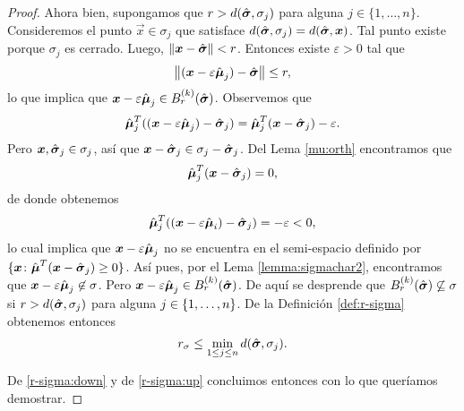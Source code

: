 \begin{proof}
	Ahora bien, supongamos que $r > d(\hat{\boldsymbol{ \sigma }}, \sigma_j)$ para alguna $j \in \lbrace 1, \ldots,
	n \rbrace$. Consideremos el punto $\vec{x} \in \sigma_j$ que satisface $d(\hat{\boldsymbol{ \sigma }}, \sigma_j) =
	d(\hat{\boldsymbol{ \sigma }}, \boldsymbol{x})$. Tal punto existe porque $\sigma_j$ es cerrado. Luego,
	$\left\lVert \boldsymbol{x} - \hat{\boldsymbol{ \sigma }} \right\rVert < r$. Entonces existe $\varepsilon > 0$ tal que
	\begin{equation*}
		\left\lVert (\boldsymbol{x} - \varepsilon\hat{\boldsymbol{ \mu }}_j) - \hat{\boldsymbol{ \sigma }} \right\rVert \leq r,
	\end{equation*}
	lo que implica que $\boldsymbol{x} - \varepsilon\hat{\boldsymbol{ \mu }}_j \in
	B_r^{(k)}(\hat{\boldsymbol{ \sigma }})$. Observemos que
	\begin{equation*}
		\hat{\boldsymbol{\mu}}_j^T((\boldsymbol{x} - \varepsilon\hat{\boldsymbol{\mu}}_j) - \hat{\boldsymbol{ \sigma }}_j)
		=
		\hat{\boldsymbol{\mu}}_j^T(\boldsymbol{x} - \hat{\boldsymbol{ \sigma }}_j) - \varepsilon.
	\end{equation*}
	Pero $\boldsymbol{x}, \hat{\boldsymbol{ \sigma }}_j \in \sigma_j$, así que $\boldsymbol{x} - \hat{\boldsymbol{ \sigma }}_j \in \sigma_j -
	\hat{\boldsymbol{ \sigma }}_j$. Del Lema \ref{mu:orth} encontramos que
	\begin{equation*}
		\hat{\boldsymbol{\mu}}_j^T(\boldsymbol{x} - \hat{\boldsymbol{ \sigma }}_j) = 0,
	\end{equation*}
	de donde obtenemos
	\begin{equation*}
		\hat{\boldsymbol{\mu}}_j^T((\boldsymbol{x} - \varepsilon\hat{\boldsymbol{\mu}}_i) - \hat{\boldsymbol{ \sigma }}_j)
		= -\varepsilon < 0,
	\end{equation*}
	lo cual implica que $\boldsymbol{x} - \varepsilon\hat{\boldsymbol{\mu}}_j$ no se encuentra en el semi-espacio
	definido por $\lbrace \boldsymbol{x} \colon \hat{\boldsymbol{\mu}}^T(\boldsymbol{x} - \hat{\boldsymbol{ \sigma }}_j) \geq 0 \rbrace$. Así pues,
	por el Lema \ref{lemma:sigmachar2}, encontramos que $\boldsymbol{x} - \varepsilon\hat{\boldsymbol{\mu}}_j \not\in
	\sigma$. Pero $\boldsymbol{x} - \varepsilon\hat{\boldsymbol{\mu}}_j \in B_r^{(k)}(\hat{\boldsymbol{ \sigma }})$. De aquí se desprende
	que $B_r^{(k)}(\hat{\boldsymbol{ \sigma }}) \not\subseteq \sigma$ si $r > d(\hat{\boldsymbol{ \sigma }}, \sigma_j)$ para
	alguna $j \in \lbrace 1, \ldots, n \rbrace$. De la Definición \ref{def:r-sigma} obtenemos entonces
	\begin{equation}
		\label{r-sigma:up}
		r_\sigma \leq \min_{1 \leq j \leq n}d(\hat{\boldsymbol{ \sigma }}, \sigma_j).
	\end{equation}

	De \eqref{r-sigma:down} y de \eqref{r-sigma:up} concluimos entonces con lo que queríamos
	demostrar.
\end{proof}

